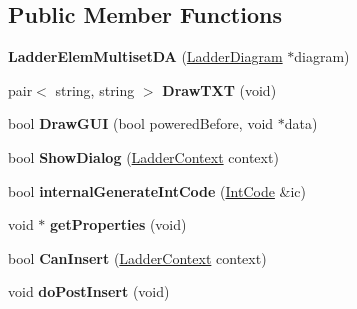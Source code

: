 \subsection*{Public Member Functions}
\begin{DoxyCompactItemize}
\item 
\hypertarget{class_ladder_elem_multiset_d_a_ac925e3d61d598cf62aa4d99d702641ef}{{\bfseries Ladder\-Elem\-Multiset\-D\-A} (\hyperlink{class_ladder_diagram}{Ladder\-Diagram} $\ast$diagram)}\label{class_ladder_elem_multiset_d_a_ac925e3d61d598cf62aa4d99d702641ef}

\item 
\hypertarget{class_ladder_elem_multiset_d_a_a6abeeeab83bb90252a3a68db3d8e6afe}{pair$<$ string, string $>$ {\bfseries Draw\-T\-X\-T} (void)}\label{class_ladder_elem_multiset_d_a_a6abeeeab83bb90252a3a68db3d8e6afe}

\item 
\hypertarget{class_ladder_elem_multiset_d_a_a8a93211693b6685f744b06f05695b463}{bool {\bfseries Draw\-G\-U\-I} (bool powered\-Before, void $\ast$data)}\label{class_ladder_elem_multiset_d_a_a8a93211693b6685f744b06f05695b463}

\item 
\hypertarget{class_ladder_elem_multiset_d_a_a61d288dc56482003bff7ffd95d0b7b48}{bool {\bfseries Show\-Dialog} (\hyperlink{struct_ladder_context}{Ladder\-Context} context)}\label{class_ladder_elem_multiset_d_a_a61d288dc56482003bff7ffd95d0b7b48}

\item 
\hypertarget{class_ladder_elem_multiset_d_a_aeb336bd5e33722932aac958c15954f5f}{bool {\bfseries internal\-Generate\-Int\-Code} (\hyperlink{class_int_code}{Int\-Code} \&ic)}\label{class_ladder_elem_multiset_d_a_aeb336bd5e33722932aac958c15954f5f}

\item 
\hypertarget{class_ladder_elem_multiset_d_a_a9d92ef11005ca49e5d51f331efb86f4e}{void $\ast$ {\bfseries get\-Properties} (void)}\label{class_ladder_elem_multiset_d_a_a9d92ef11005ca49e5d51f331efb86f4e}

\item 
\hypertarget{class_ladder_elem_multiset_d_a_aa2da0e9a5caee1ecc222cb4ee860469c}{bool {\bfseries Can\-Insert} (\hyperlink{struct_ladder_context}{Ladder\-Context} context)}\label{class_ladder_elem_multiset_d_a_aa2da0e9a5caee1ecc222cb4ee860469c}

\item 
\hypertarget{class_ladder_elem_multiset_d_a_a9ee7bdb9bb56aa0c6e82f27b7ecad1c2}{void {\bfseries do\-Post\-Insert} (void)}\label{class_ladder_elem_multiset_d_a_a9ee7bdb9bb56aa0c6e82f27b7ecad1c2}


\end{DoxyCompactItemize}

